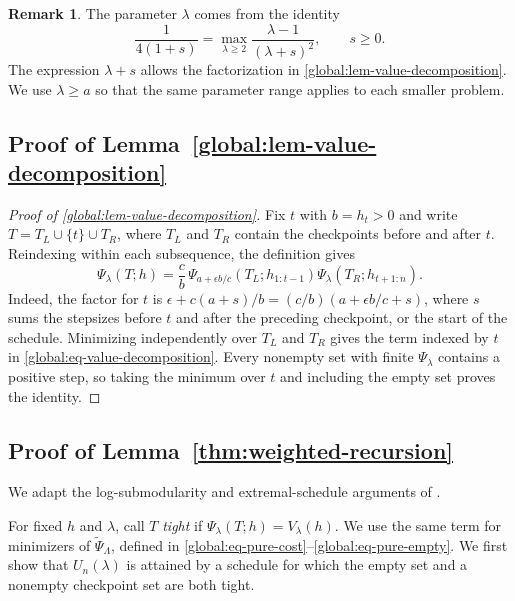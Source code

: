 \documentclass[11pt,letterpaper]{article}
\theoremstyle{definition}
\newtheorem{remark}[remark]{Remark}
\begin{document}
\begin{remark}
The parameter $\lambda$ comes from the identity
\[
  \frac{1}{4(1+s)}
  =\max_{\lambda\ge2}\frac{\lambda-1}{(\lambda+s)^2},
  \qquad s\ge0.
\]
The expression $\lambda+s$ allows the factorization in \cref{global:lem-value-decomposition}.
We use $\lambda\ge a$ so that the same parameter range applies to each smaller problem.
\end{remark}

\subsection{Proof of Lemma~\ref{global:lem-value-decomposition}}
\label{global:app-value-decomposition}
\begin{proof}[Proof of \cref{global:lem-value-decomposition}]
Fix $t$ with $b=h_t>0$ and write $T=T_L\cup\{t\}\cup T_R$, where $T_L$ and $T_R$ contain the checkpoints before and after $t$.
Reindexing within each subsequence, the definition gives
\[
  \Psi_\lambda(T;h)
  =\frac cb\,
    \Psi_{a+\epsilon b/c}(T_L;h_{1:t-1})
    \Psi_\lambda(T_R;h_{t+1:n}).
\]
Indeed, the factor for $t$ is $\epsilon+c(a+s)/b=(c/b)(a+\epsilon b/c+s)$, where $s$ sums the stepsizes before $t$ and after the preceding checkpoint, or the start of the schedule.
Minimizing independently over $T_L$ and $T_R$ gives the term indexed by $t$ in \eqref{global:eq-value-decomposition}.
Every nonempty set with finite $\Psi_\lambda$ contains a positive step, so taking the minimum over $t$ and including the empty set proves the identity.
\end{proof}

\subsection{Proof of Lemma~\ref{thm:weighted-recursion}}
\label{global:app-uniform-growth}
\label{global:app-extremizers}
\label{global:app-gap-splitting}
\label{global:app-cost-preservation}
\label{global:app-weighted-splitting}

We adapt the log-submodularity and extremal-schedule arguments of \citet[Lemmas~C.1--C.2 and Appendix~C.6]{JungChoYun2026}.

For fixed $h$ and $\lambda$, call $T$ \emph{tight} if $\Psi_\lambda(T;h)=V_\lambda(h)$.
We use the same term for minimizers of $\widetilde\Psi_\Lambda$, defined in \eqref{global:eq-pure-cost}--\eqref{global:eq-pure-empty}.
We first show that $U_n(\lambda)$ is attained by a schedule for which the empty set and a nonempty checkpoint set are both tight.
\end{document}
